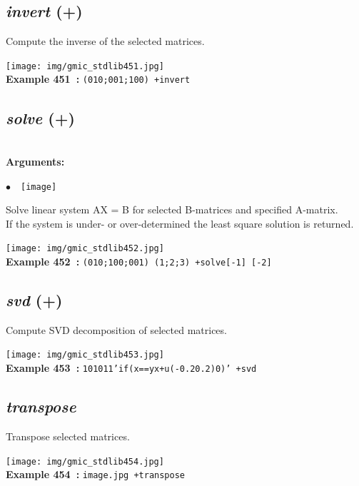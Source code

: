\documentclass[a4paper,10.5pt,twoside]{book}
\def\comma{\discretionary{,}{}{,}}
\newcommand{\Cb}[1]{\textcolor{cb}{#1}}
\begin{document}
\subsection{\emph{invert} (+)}\vspace*{-0.7em}
Compute the inverse of the selected matrices.
\begin{center}\texttt{[image: img/gmic\_stdlib451.jpg]}\\
{\footnotesize \textbf{Example 451~:} \texttt{(0{\comma}1{\comma}0;0{\comma}0{\comma}1;1{\comma}0{\comma}0) +invert}}
\end{center}

\subsection{\emph{solve} (+)}\vspace*{-0.7em}
~\\\textbf{\Cb{Arguments: }}\begin{flushleft}
{\small \Cb{\hspace*{0.5cm}$\bullet$~~\texttt{[image]}}}\end{flushleft}
Solve linear system AX = B for selected B-matrices and specified A-matrix.
~\\If the system is under- or over-determined{\comma} the least square solution is returned.
\begin{center}\texttt{[image: img/gmic\_stdlib452.jpg]}\\
{\footnotesize \textbf{Example 452~:} \texttt{(0{\comma}1{\comma}0;1{\comma}0{\comma}0;0{\comma}0{\comma}1) (1;2;3) +solve[-1] [-2]}}
\end{center}

\subsection{\emph{svd} (+)}\vspace*{-0.7em}
Compute SVD decomposition of selected matrices.
\begin{center}\texttt{[image: img/gmic\_stdlib453.jpg]}\\
{\footnotesize \textbf{Example 453~:} \texttt{10{\comma}10{\comma}1{\comma}1{\comma}'if(x==y{\comma}x+u(-0.2{\comma}0.2){\comma}0)' +svd}}
\end{center}

\subsection{\emph{transpose} }\vspace*{-0.7em}
Transpose selected matrices.
\begin{center}\texttt{[image: img/gmic\_stdlib454.jpg]}\\
{\footnotesize \textbf{Example 454~:} \texttt{image.jpg +transpose}}
\end{center}
\end{document}
